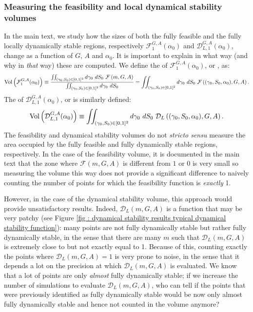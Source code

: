 \documentclass[12pt, titlepage, twoside, openright]{report}
\begin{document}
\subsubsection{Measuring the feasibility and local dynamical stability volumes}\label{app: how to measure volume}
In the main text, we study how the sizes of both the fully feasible and the fully locally dynamically stable regions, respectively $\mathcal{F}_1^{G,A}(\alpha_0)$ and $\mathcal{D}_{L,1}^{G,A}(\alpha_0)$, change as a function of $G$, $A$ and $\alpha_0$. It is important to explain in what way (and why in \textit{that} way) these are computed. We define the  of $\mathcal{F}^{G,A}_1(\alpha_0)$, or , as:
\begin{equation}
\vol{\mathcal{F}^{G,A}_1(\alpha_0)}\defined \frac{\iint_{(\gamma_0, S_0)\in[0,1]^2} d\gamma_0 \ dS_0 \ \mathcal{F}\left(m, G, A\right)}{\iint_{(\gamma_0, S_0)\in[0,1]^2} d\gamma_0 \ dS_0} = \iint_{(\gamma_0, S_0)\in[0,1]^2} d\gamma_0 \ dS_0 \ \mathcal{F}\left((\gamma_0, S_0, \alpha_0), G, A\right). \label{eq : app definition fully feasible volume of G, A}
\end{equation}
The  of $\mathcal{D}_{L,1}^{G,A}(\alpha_0)$, or  is similarly defined:
\begin{equation}
\vol{\mathcal{D}_{L,1}^{G,A}(\alpha_0)}\defined \iint_{(\gamma_0, S_0)\in[0,1]^2} d\gamma_0 \ dS_0 \ \mathcal{D}_L\left((\gamma_0, S_0, \alpha_0), G, A\right).
\end{equation}
The feasibility and dynamical stability volumes do not \textit{stricto sensu} measure the area occupied by the fully feasible and fully dynamically stable regions, respectively. In the case of the feasibility volume, it is documented in the main text that the zone where $\mathcal{F}(m, G,A)$ is different from $1$ or $0$ is very small so measuring the volume this way does not provide a significant difference to naively counting the number of points for which the feasibility function is \textit{exactly} 1.

However, in the case of the dynamical stability volume, this approach would provide unsatisfactory results. Indeed, $\mathcal{D}_{L}(m, G, A)$ is a function that may be very patchy (see Figure \ref{fig : dynamical stability results typical dynamical stability function}): many points are not fully dynamically stable but rather  fully dynamically stable, in the sense that there are many $m$ such that $\mathcal{D}_{L}(m, G, A)$ is extremely close to but not exactly equal to 1. Because of this, counting exactly the points where $\mathcal{D}_{L}(m, G, A)=1$ is very prone to noise, in the sense that it depends a lot on the precision at which $\mathcal{D}_L(m,G,A)$ is evaluated. We know that a lot of points are only \textit{almost} fully dynamically stable; if we increase the number of simulations to evaluate $\mathcal{D}_{L}(m, G, A)$, who can tell if the points that were previously identified as fully dynamically stable would be now only almost fully dynamically stable and hence not counted in the volume anymore?
\end{document}
